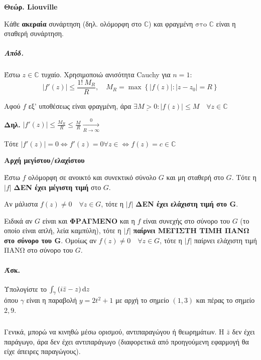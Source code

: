 \documentclass[12pt,a4paper,titlepage,fleqn]{article}
\begin{document}
\begin{enumparen}
    	\item \textbf{Θεώρ. Liouville}
    	
    	Κάθε \textbf{ακεραία} συνάρτηση (δηλ. ολόμορφη στο \( \mathbb C  \)) και φραγμένη
    	\( \boxed{\text{στο } \mathbb C}  \) είναι η σταθερή συνάρτηση.
    	\subparagraph{Απόδ.}
    	Έστω \( z \in \mathbb C  \) τυχαίο. Χρησιμοποιώ ανισότητα Cauchy για \( n=1 \):
    	\[
    	\left|f'(z)\right| \leq \frac{1!\ M_R}{R},\quad M_R = \max
    	\left\lbrace \left|f(z)\right|: |z-z_0|=R \right\rbrace
    	\]
    	
    	Αφού \( f \) εξ' υποθέσεως είναι φραγμένη, άρα \( \exists \underline{M > 0}:
    	\left|f(z)\right| \leq M \quad \forall z \in \mathbb C 
    	 \)
    	 
    	\textbf{Δηλ.} \(  \displaystyle
    	\left|f'(z)\right| \leq \frac{M_R}{R} \leq \frac{M}{R}
    	\xrightarrow[R\to \infty] 0
    	 \)
    	 
        Τότε \( \left|f'(z)\right| = 0 \iff f'(z)=0 \forall z\in
        \iff f(z) = c\in\mathbb C 
        \)
        
        \item \textbf{Αρχή μεγίστου/ελαχίστου}
        
        Έστω \( f \) ολόμορφη σε ανοικτό και συνεκτικό σύνολο \( G \) και μη σταθερή στο
        \( G \). Τότε η \( |f| \) \textbf{ΔΕΝ έχει μέγιστη τιμή} στο \( G \).
        
        Αν μάλιστα \( f(z) \neq 0 \quad \forall z \in G \), τότε η \( |f| \)
        \textbf{ΔΕΝ έχει ελάχιστη τιμή στο \( \mathbf G \)}.
        
        Ειδικά αν \( G \) είναι και \textbf{ΦΡΑΓΜΕΝΟ} και η \( f \) είναι συνεχής στο
        σύνορο του \( G \) (το οποίο είναι απλή, λεία καμπύλη), τότε η \( |f| \)
        \textbf{παίρνει ΜΕΓΙΣΤΗ ΤΙΜΗ ΠΑΝΩ στο σύνορο του \( \mathbf G \)}.
        Ομοίως αν \( f(z) \neq 0 \quad \forall z \in G \), τότε η \( |f| \)
        παίρνει ελάχιστη τιμή ΠΑΝΩ στο σύνορο του \( G \).
    	
    \end{enumparen}
    
    \paragraph{Άσκ.} Υπολογίστε το \( \int_\gamma \left( i\bar z - z \right)\dif z \)
    \\ όπου \( \gamma \) είναι η παραβολή \( y=2t^2+1 \) με αρχή το σημείο \( (1,3) \)
    και πέρας το σημείο \( 2,9 \).
    \subparagraph{}
    Γενικά, μπορώ να κινηθώ μέσω ορισμού, αντιπαραγώγου ή θεωρημάτων. Η \( \bar z \)
    δεν έχει παράγωγο, άρα δεν έχει αντιπαράγωγο (διαφορετικά από προηγούμενη εφαρμογή
    θα είχε άπειρες παραγώγους).
    
\end{document}
